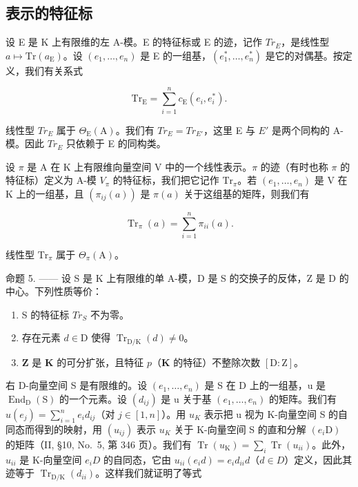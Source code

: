 \subsection{表示的特征标}

设 E 是 K 上有限维的左 A-模。E 的特征标或 E 的迹，记作 \(Tr_{E}\)，是线性型 \(a \mapsto \mathrm{Tr}(a_{\mathrm{E}})\)。设 \((e_{1}, \ldots, e_{n})\) 是 E 的一组基，\((e_{1}^{*}, \ldots, e_{n}^{*})\) 是它的对偶基。按定义，我们有关系式

\[
\mathrm{Tr} _ {\mathrm{E}} = \sum_ {i = 1} ^ {n} c _ {\mathrm{E}} (e _ {i}, e _ {i} ^ {*}).\tag{7}
\]

线性型 \(Tr_{E}\) 属于 \(\Theta_{\mathrm{E}}(\mathrm{A})\)。我们有 \(Tr_{E} = Tr_{E'}\)，这里 E 与 \(E'\) 是两个同构的 A-模。因此 \(Tr_{E}\) 只依赖于 E 的同构类。

设 \(\pi\) 是 A 在 K 上有限维向量空间 V 中的一个线性表示。\(\pi\) 的迹（有时也称 \(\pi\) 的特征标）定义为 A-模 \(V_{\pi}\) 的特征标，我们把它记作 \(\mathrm{Tr}_{\pi}\)。若 \((e_1, \ldots, e_n)\) 是 V 在 K 上的一组基，且 \((\pi_{ij}(a))\) 是 \(\pi(a)\) 关于这组基的矩阵，则我们有

\[
\operatorname{Tr} _ {\pi} (a) = \sum_ {i = 1} ^ {n} \pi_ {i i} (a).\tag{8}
\]

线性型 \(\mathrm{Tr}_{\pi}\) 属于 \(\Theta_{\pi}(\mathrm{A})\)。

命题 5. —— 设 S 是 K 上有限维的单 A-模，D 是 S 的交换子的反体，Z 是 D 的中心。下列性质等价：

\begin{enumerate}
\def\labelenumi{(\roman{enumi})}
\item
  S 的特征标 \(Tr_{S}\) 不为零。
\item
  存在元素 \(d \in \mathrm{D}\) 使得 \(\operatorname{Tr}_{\mathrm{D} / \mathrm{K}}(d) \neq 0\)。
\item
  \(\mathbf{Z}\) 是 \(\mathbf{K}\) 的可分扩张，且特征 \(p\)（\(\mathbf{K}\) 的特征）不整除次数 \([\mathrm{D}:\mathrm{Z}]\)。
\end{enumerate}

右 D-向量空间 S 是有限维的。设 \((e_{1},\ldots,e_{n})\) 是 S 在 D 上的一组基，u 是 \(\operatorname{End}_{\mathrm{D}}(\mathrm{S})\) 的一个元素。设 \((d_{ij})\) 是 u 关于基 \((e_{1},\ldots,e_{n})\) 的矩阵。我们有 \(u(e_{j})=\sum_{i=1}^{n}e_{i}d_{ij}\)（对 \(j\in[1,n]\)）。用 \(u_{K}\) 表示把 u 视为 K-向量空间 S 的自同态而得到的映射，用 \((u_{ij})\) 表示 \(u_{K}\) 关于 K-向量空间 S 的直和分解 \((e_{i}\mathrm{D})\) 的矩阵（II, §10, No.~5, 第 346 页）。我们有 \(\operatorname{Tr}(u_{\mathrm{K}})=\sum_{i}\operatorname{Tr}(u_{ii})\)。此外，\(u_{ii}\) 是 K-向量空间 \(e_{i}D\) 的自同态，它由 \(u_{ii}(e_{i}d)=e_{i}d_{ii}d\)（\(d\in D\)）定义，因此其迹等于 \(\operatorname{Tr}_{\mathrm{D}/\mathrm{K}}(d_{ii})\)。这样我们就证明了等式

